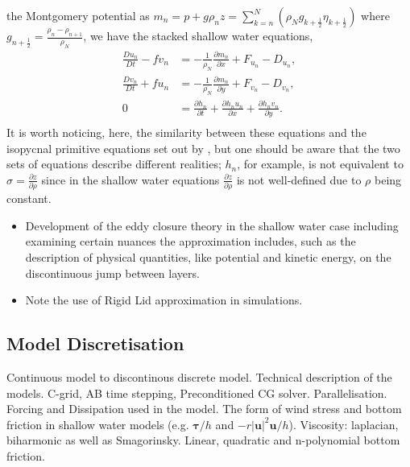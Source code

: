 \documentclass[10pt,a4paper]{article}
\begin{document}
   the Montgomery potential as
   $m_{n}=p+g \rho_{n} z=\sum^{N}_{k=n}\left(\rho_{N} g_{k+\frac{1}{2}} \eta_{k+\frac{1}{2}} \right) $ where 
   $g_{n+\frac{1}{2}} =  \frac{\rho_{n} - \rho_{n+1}}{\rho_{N}}$, we have the stacked shallow water
   equations, 
   \begin{equation}
   \begin{split}
   \frac{Du_{n}}{Dt}-fv_{n} &= -\frac{1}{\rho_{N}}   \frac{\partial m_{n}}{\partial x}+F_{u_{n}}-D_{u_{n}}, \\
   \frac{Dv_{n}}{Dt}+fu_{n} &= -\frac{1}{\rho_{N}}   \frac{\partial m_{n}}{\partial y}+F_{v_{n}}-D_{v_{n}}, \\
   0 &=\frac{\partial h_{n} }{\partial t} +\frac{\partial h_{n} u_{n}}{\partial x}+
   \frac{\partial h_{n} v_{n} }{\partial y}.\\
   \end{split}
   \end{equation}
   It is worth noticing, here, the similarity between these equations and the isopycnal
    primitive    equations set out by \cite{young2012exact}, but one should be aware that
    the two sets of equations describe different realities; $h_{n}$, for example, is not
    equivalent to $\sigma = \frac{\partial z}{\partial \rho}$ since in the shallow water
    equations $\frac{\partial z}{\partial \rho}$ is not well-defined due to  $\rho$ being constant.
   
   
\begin{itemize}
\item Development of the eddy closure theory in the shallow water case
including examining certain nuances the approximation includes, such
as the description of physical quantities, like
potential and kinetic energy, on the discontinuous 
jump between layers.
\item Note the use of Rigid Lid approximation in
simulations.
\end{itemize}

\subsection{Model Discretisation}

Continuous model to discontinous discrete model.
Technical description of the models. 
C-grid, AB time stepping, Preconditioned CG solver. 
Parallelisation.
Forcing and Dissipation used in the model.
The form of wind stress and bottom friction in
shallow water models (e.g. $\boldsymbol{\tau}/h$ and 
$-r\left|\boldsymbol{u}\right|^{2}\boldsymbol{u}/h$). Viscosity:
laplacian, biharmonic as well as Smagorinsky.
Linear, quadratic and n-polynomial bottom friction.
\end{document}
